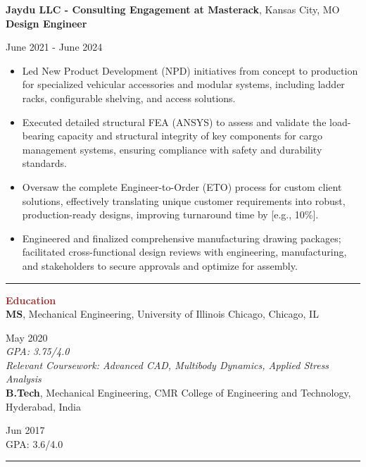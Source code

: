 \documentclass[11pt, letterpaper]{article}
\begin{document}
\textbf{Jaydu LLC - Consulting Engagement at Masterack}, Kansas City, MO\\
\textbf{Design Engineer}\hfill \raggedright{June 2021 - June 2024}\\ %
\begin{itemize}[leftmargin=*, label=\textbullet]
\setlength\itemsep{-2pt}
\vspace{-8pt}
\item Led New Product Development (NPD) initiatives from concept to production for specialized vehicular accessories and modular systems, including ladder racks, configurable shelving, and access solutions.
\item Executed detailed structural FEA (ANSYS) to assess and validate the load-bearing capacity and structural integrity of key components for cargo management systems, ensuring compliance with safety and durability standards.
\item Oversaw the complete Engineer-to-Order (ETO) process for custom client solutions, effectively translating unique customer requirements into robust, production-ready designs, improving turnaround time by [e.g., 10\%].
\item Engineered and finalized comprehensive manufacturing drawing packages; facilitated cross-functional design reviews with engineering, manufacturing, and stakeholders to secure approvals and optimize for assembly.
\end{itemize}
\vspace{-8pt}
\noindent \rule[2pt]{\textwidth}{0.5pt}
\noindent \textbf{\large \textcolor{Brown}{Education}}\vspace{2pt}\\
\textbf{MS}, Mechanical Engineering, University of Illinois Chicago, Chicago, IL \hfill \raggedright{May 2020}\\
\textit{GPA: 3.75/4.0}\\
\textit{Relevant Coursework: Advanced CAD, Multibody Dynamics, Applied Stress Analysis}\\ %
\vspace{6pt}
\textbf{B.Tech}, Mechanical Engineering, CMR College of Engineering and Technology, Hyderabad, India \hfill \raggedright{Jun 2017}\\
{GPA: 3.6/4.0}\\
\vspace{-2pt}
 \noindent \rule[2pt]{\textwidth}{0.5pt}
\end{document}

